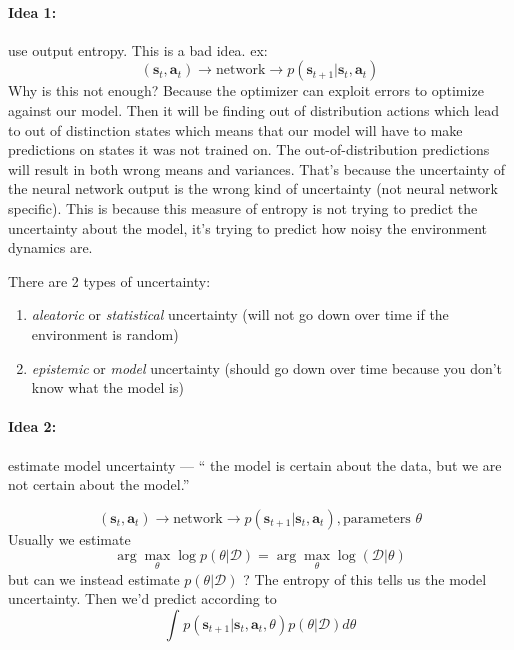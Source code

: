 \documentclass{report}
\newcommand{\argmax}{\arg\!\max}
\begin{document}
\paragraph{Idea 1:} use output entropy. This is a bad idea.
ex:
\begin{equation}
		(\bm{s}_{t}, \bm{a}_{t} ) \to \text{network} \to p( \bm{s}_{t+1}| \bm{s}_{t}, \bm{a}_{t})
\end{equation}
Why is this not enough? Because the optimizer can exploit errors to optimize against our model.
Then it will be finding out of distribution actions which lead to out of distinction states which means
that our model will have to make predictions on states it was not trained on.
The out-of-distribution predictions will result in both wrong means and variances.
That's because the uncertainty of the neural network output is the wrong kind of uncertainty (not neural network specific).
This is because this measure of entropy is not trying to predict the uncertainty about the model,
it's trying to predict how noisy the environment dynamics are.

There are 2 types of uncertainty:
\begin{enumerate}
		\item \textit{aleatoric} or \textit{statistical} uncertainty (will not go down over time if the environment is random)
		\item \textit{epistemic} or \textit{model} uncertainty (should go down over time because you don't know what the model is)
\end{enumerate}

\paragraph{Idea 2:} estimate model uncertainty --- `` the model is certain about the data, but we are not certain about the model.''

\begin{equation}
		(\bm{s}_{t}, \bm{a}_{t} ) \to \text{network} \to p( \bm{s}_{t+1}| \bm{s}_{t}, \bm{a}_{t}), \text{parameters } \theta
\end{equation}
Usually we estimate
\begin{equation}
\argmax_\theta \log p(\theta | \mathcal{D}) = \argmax_\theta \log (\mathcal{D}| \theta)
\end{equation}
but can we instead estimate $p(\theta|\mathcal{D})$ ? The entropy of this tells us the model uncertainty.
Then we'd predict according to 
\begin{equation}
		\int_{}^{} p(\bm{s}_{t+1}| \bm{s}_{t}, \bm{a}_{t}, \theta) p(\theta|\mathcal{D}) d\theta
\end{equation}
\end{document}
